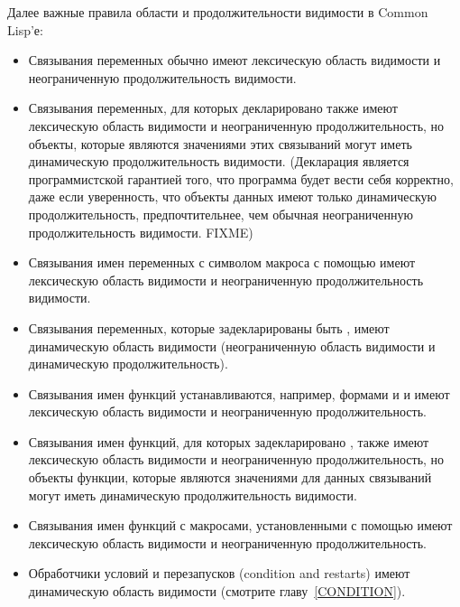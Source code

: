 Далее важные правила области и продолжительности видимости в Common Lisp'е:
\begin{itemize}
\item
Связывания переменных обычно имеют лексическую область видимости и неограниченную
продолжительность видимости.
\end{itemize}

\begin{newer}
\begin{itemize}

\item Связывания переменных, для которых декларировано  также
 имеют лексическую область видимости и неограниченную продолжительность, но
 объекты, которые являются значениями этих связываний могут иметь динамическую
 продолжительность видимости.
(Декларация является программистской гарантией того, что программа будет вести
себя корректно, даже если уверенность, что объекты данных имеют только
динамическую продолжительность, предпочтительнее, чем обычная неограниченную
продолжительность видимости. FIXME)

\item Связывания имен переменных с символом макроса с помощью
   имеют лексическую область видимости и неограниченную
  продолжительность видимости.
\end{itemize}
\end{newer}

\begin{itemize}

\item 
Связывания переменных, которые задекларированы быть ,
имеют динамическую область видимости (неограниченную область видимости и
динамическую продолжительность).
\end{itemize}

\begin{newer}
\begin{itemize}

\item Связывания имен функций устанавливаются, например, формами  и
   и имеют лексическую область видимости и неограниченную продолжительность.

\item Связывания имен функций, для которых задекларировано ,
  также имеют лексическую область видимости и неограниченную продолжительность,
  но объекты функции, которые являются значениями для данных связываний могут
  иметь динамическую продолжительность видимости.

\item Связывания имен функций с макросами, установленными с помощью
   имеют лексическую область видимости и неограниченную
  продолжительность.

\item Обработчики условий и перезапусков (condition and restarts) имеют
  динамическую область видимости (смотрите главу~\ref{CONDITION}).
\end{itemize}
\end{newer}

